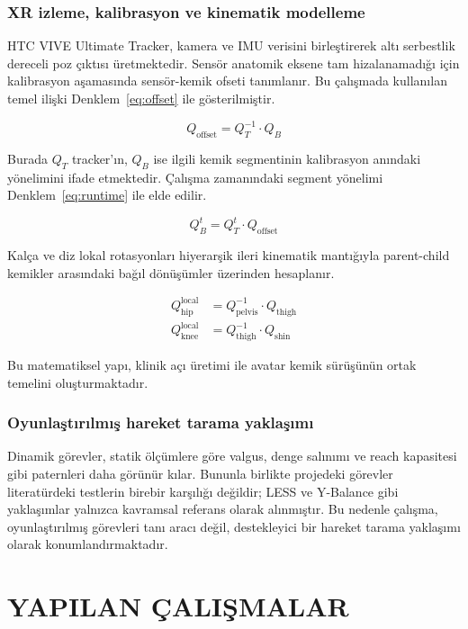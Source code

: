 \documentclass[12pt,a4paper,oneside]{report}
\begin{document}
\subsection{XR izleme, kalibrasyon ve kinematik modelleme}
HTC VIVE Ultimate Tracker, kamera ve IMU verisini birleştirerek altı serbestlik dereceli poz çıktısı üretmektedir. Sensör anatomik eksene tam hizalanamadığı için kalibrasyon aşamasında sensör-kemik ofseti tanımlanır. Bu çalışmada kullanılan temel ilişki Denklem~\ref{eq:offset} ile gösterilmiştir.

\begin{equation}
Q_{\text{offset}} = Q_T^{-1} \cdot Q_B
\label{eq:offset}
\end{equation}

Burada $Q_T$ tracker'ın, $Q_B$ ise ilgili kemik segmentinin kalibrasyon anındaki yönelimini ifade etmektedir. Çalışma zamanındaki segment yönelimi Denklem~\ref{eq:runtime} ile elde edilir.

\begin{equation}
Q_B^t = Q_T^t \cdot Q_{\text{offset}}
\label{eq:runtime}
\end{equation}

Kalça ve diz lokal rotasyonları hiyerarşik ileri kinematik mantığıyla parent-child kemikler arasındaki bağıl dönüşümler üzerinden hesaplanır.

\begin{align}
Q_{\text{hip}}^{\text{local}} &= Q_{\text{pelvis}}^{-1} \cdot Q_{\text{thigh}} \\
Q_{\text{knee}}^{\text{local}} &= Q_{\text{thigh}}^{-1} \cdot Q_{\text{shin}}
\label{eq:localrot}
\end{align}

Bu matematiksel yapı, klinik açı üretimi ile avatar kemik sürüşünün ortak temelini oluşturmaktadır.

\subsection{Oyunlaştırılmış hareket tarama yaklaşımı}
Dinamik görevler, statik ölçümlere göre valgus, denge salınımı ve reach kapasitesi gibi paternleri daha görünür kılar. Bununla birlikte projedeki görevler literatürdeki testlerin birebir karşılığı değildir; LESS ve Y-Balance gibi yaklaşımlar yalnızca kavramsal referans olarak alınmıştır. Bu nedenle çalışma, oyunlaştırılmış görevleri tanı aracı değil, destekleyici bir hareket tarama yaklaşımı olarak konumlandırmaktadır.

\chapter{YAPILAN ÇALIŞMALAR}
\end{document}
